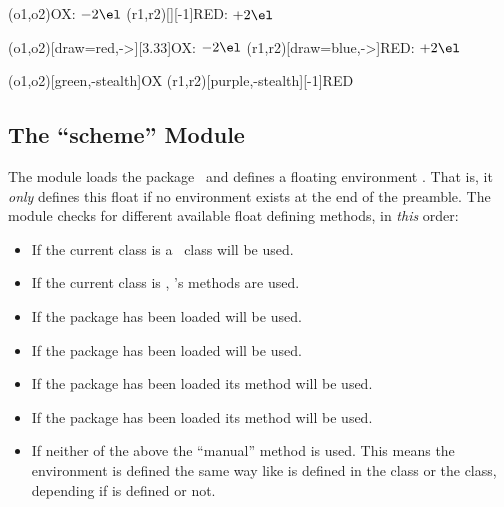 \documentclass[load-preamble+]{cnltx-doc}
\def\chemmodule*#1{\textquotedblleft#1\textquotedblright}%
\begin{document}
\begin{example}
  \vspace{7mm}
  \redox(o1,o2){\small OX: $- 2\el$}
  \redox(r1,r2)[][-1]{\small RED: $+ 2\el$}
  \vspace{7mm}
\end{example}

\begin{example}
  \vspace{14mm}
  \redox(o1,o2)[draw=red,->][3.33]{\small OX: $- 2\el$}
  \redox(r1,r2)[draw=blue,->]{\small RED: $+ 2\el$}
\end{example}

\begin{example}
  \vspace{7mm}
  \redox(o1,o2)[green,-stealth]{\small OX}
  \redox(r1,r2)[purple,-stealth][-1]{\small RED}
  \vspace{7mm}
\end{example}

\subsection{The \chemmodule*{scheme} Module}\label{sec:scheme-module}

The  module loads the 
package~\cite{pkg:chemnum} and defines a floating environment
.  That is, it \emph{only} defines this float if no
environment  exists at the end of the preamble.  The module checks
for different available float defining methods, in \emph{this} order:
\begin{itemize}
  \item If the current class is a \KOMAScript\ class  will
    be used.
  \item If the current class is , 's methods are used.
  \item If the package  has been loaded  will
    be used.
  \item If the package  has been loaded
     will be used.
  \item {}If the package  has been loaded its
    method will be used.
  \item If the package  has been loaded its method will be used.
  \item If neither of the above the \enquote{manual} method is used.  This
    means the environment is defined the same way like  is
    defined in the  class or the  class, depending if
     is defined or not.
\end{itemize}
\end{document}
